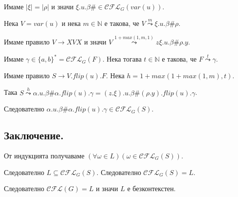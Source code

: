 \documentclass[12pt]{article}
\begin{document}
Имаме \(|\xi| = |\rho|\) и значи \(\xi.u.\beta\# \in \mathcal{CFL}_G(var(u))\).

Нека \(V = var(u)\) и нека \(m \in \mathbb{N}\) е такова, че \(V \overset{m}{\leadsto} \xi.u.\beta\#\rho\).

Имаме правило \(V \to XVX\) и значи \(V \overset{1 + max(1, m, 1)}{\leadsto} z\xi.u.\beta\#\rho.y\).

Имаме \(\gamma \in \{a, b\}^* = \mathcal{CFL}_G(F)\). Нека тогава \(t \in \mathbb{N}\) е такова, че \(F \overset{t}{\leadsto} \gamma\).

Имаме правило \(S \to V . flip(u) . F\). Нека \(h = 1 + max(1 + max(1, m), t)\).

Така \(S \overset{h}{\leadsto} \alpha.u.\beta\#\alpha.flip(u).\gamma = (z.\xi).u.\beta\#(\rho.y).flip(u).\gamma\).

Следователно \(\alpha.u.\beta\#\alpha.flip(u).\gamma \in \mathcal{CFL}_G(S)\).

\subsection*{Заключение.}
От индукцията получаваме 
\((\forall \omega \in L)(\omega \in \mathcal{CFL}_G(S))\).

Следователно \(L \subseteq \mathcal{CFL}_G(S)\). Следователно \(\mathcal{CFL}_G(S) = L\).

Следователно \(\mathcal{CFL}(G) = L\) и значи \(L\) е безконтекстен.
\end{document}
